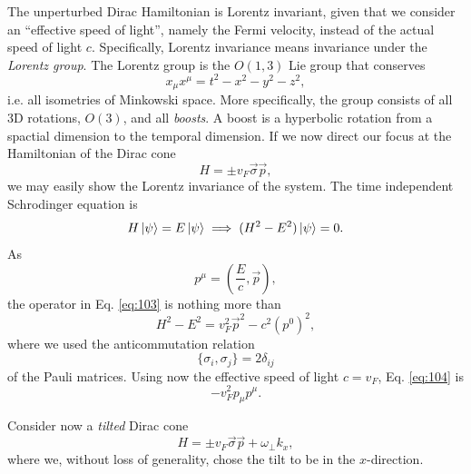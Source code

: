 The unperturbed Dirac Hamiltonian is Lorentz invariant, given that we consider an ``effective speed of light'', namely the Fermi velocity, instead of the actual speed of light \( c \).
Specifically, Lorentz invariance means invariance under the \emph{Lorentz group}.
The Lorentz group is the \( O(1,3) \) Lie group that conserves
\[
x_{\mu } x^{\mu } = t^2 - x^2 - y^2 - z^2,
\]
i.e. all isometries of Minkowski space.
More specifically, the group consists of all 3D rotations, \( O(3) \), and all \emph{boosts}.
A boost is a hyperbolic rotation from a spactial dimension to the temporal dimension.
If we now direct our focus at the Hamiltonian of the Dirac cone
\[
H = \pm v_{F} \vec{\sigma} \vec{p},
\]
we may easily show the Lorentz invariance of the system.
The time independent Schrodinger equation is
\begin{equation}
  \label{eq:103}
  H \ket{\psi } = E \ket{\psi } \implies (H^2 - E^2) \ket{\psi } = 0.
\end{equation}
As
\[
p^{\mu } = \left(\frac{E}{c}, \vec{p}\right),
\]
the operator in Eq. \eqref{eq:103} is nothing more than
\begin{equation}
  \label{eq:104}
  H^2-E^2 = v_{F}^2 \vec{p}^2 - c^2 \left(p^0\right)^2 ,
\end{equation}
where we used the anticommutation relation
\[
\{\sigma_{i}, \sigma_{j}\} =  2 \delta _{ij}
\]
of the Pauli matrices.
Using now the effective speed of light \( c=v_F \), Eq. \eqref{eq:104} is
\begin{equation}
  \label{eq:105}
  - v_F^2 p_{\mu } p^{\mu }.
\end{equation}

Consider now a \emph{tilted} Dirac cone
\begin{equation}
  \label{eq:106}
  H = \pm v_F \vec{\sigma} \vec{p} + \omega_{\perp} k_x,
\end{equation}
where we, without loss of generality, chose the tilt to be in the \( x \)-direction.




